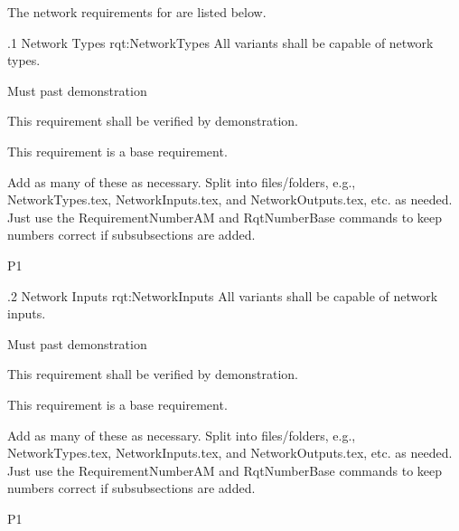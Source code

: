 The network requirements for \ThisSystem are listed below.


\ONERQMTVKPP
{\RqtNumberBase.1}
{Network Types}
{rqt:NetworkTypes}
{All \ThisSys variants shall be capable of network types.}
{
	\item [Phase 1] Must past demonstration
}
{This requirement shall be verified by demonstration.}
{
	\item [N/A] This requirement is a base requirement.
}
{
  \item Add as many of these as necessary.  Split into files/folders, e.g., NetworkTypes.tex, NetworkInputs.tex, and NetworkOutputs.tex, etc. as needed. Just use the RequirementNumberAM and RqtNumberBase commands to keep numbers correct if subsubsections are added.
}
{P1}


\ONERQMTVKPP
{\RqtNumberBase.2}
{Network Inputs}
{rqt:NetworkInputs}
{All \ThisSys variants shall be capable of \TBD network inputs.}
{
	\item [Phase 1] Must past demonstration
}
{This requirement shall be verified by demonstration.}
{
	\item [N/A] This requirement is a base requirement.
}
{
  \item Add as many of these as necessary.  Split into files/folders, e.g., NetworkTypes.tex, NetworkInputs.tex, and NetworkOutputs.tex, etc. as needed. Just use the RequirementNumberAM and RqtNumberBase commands to keep numbers correct if subsubsections are added.
}
{P1}


